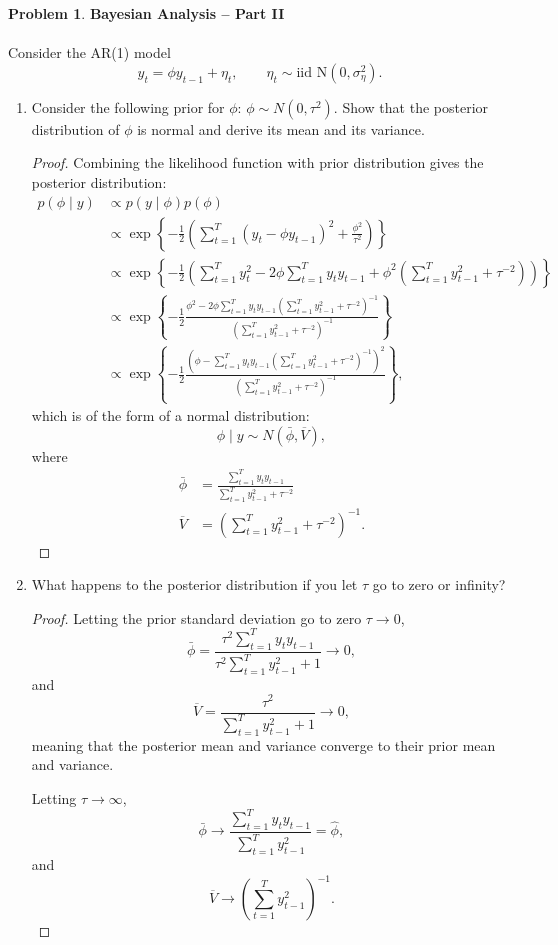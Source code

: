 \documentclass[oneside,reqno]{amsart}
\theoremstyle{definition}
\newtheorem{prob}{Problem}
\begin{document}
\begin{prob}
\textbf{Bayesian Analysis -- Part II} 
\\ \\
Consider the AR(1) model 
\[
	y_t = \phi y_{t-1} + \eta_t, \qquad \eta_t \sim \text{iid N} (0, \sigma_\eta^2).
\]
\end{prob}


\begin{enumerate}
\item
Consider the following prior for $\phi$: $\phi \sim N(0, \tau^2)$. Show that the posterior distribution of $\phi$ is normal and derive its mean and its variance.

\begin{proof}
Combining the likelihood function with prior distribution gives the posterior distribution:
\begin{align*}
	p(\phi \mid y) & \propto p(y \mid \phi) p(\phi) \\ 
	& \propto \exp\left\{- \frac{1}{2} \left( \sum_{t=1}^{T} (y_t - \phi y_{t-1} )^2  +\frac{\phi^2}{\tau^2} \right) \right\} \\
	&\propto \exp\left\{- \frac{1}{2}  \left( \sum_{t=1}^{T} y_t^2 - 2 \phi \sum_{t=1}^{T} y_t y_{t-1} + \phi^2 \left(\sum_{t=1}^{T} y_{t-1}^2 + \tau^{-2} \right) \right)\right\} \\
	& \propto \exp\left\{ - \frac{1}{2}\frac{\phi^2 - 2 \phi \sum_{t=1}^{T} y_t  y_{t-1} (\sum_{t=1}^{T}y_{t-1}^2 + \tau^{-2})^{-1}}{(\sum_{t=1}^{T} y_{t-1}^2 + \tau^{-2})^{-1}} \right\} \\
	& \propto \exp\left\{ - \frac{1}{2}\frac{(\phi - \sum_{t=1}^{T} y_t y_{t-1} (\sum_{t=1}^{T} y_{t-1}^2 + \tau^{-2})^{-1})^2}{(\sum_{t=1}^{T}  y_{t-1}^2 + \tau^{-2})^{-1}} \right\},
\end{align*}
which is of the form of a normal distribution: 
\[
	\phi \mid y\sim N(\bar \phi, \overline V),
\]
where 
\begin{align*}
	\bar \phi &=\frac{ \sum_{t=1}^{T} y_t y_{t-1}}{\sum_{t=1}^{T}y_{t-1}^2 + \tau^{-2}} \\
	\overline V &= \left(\sum_{t=1}^{T} y_{t-1}^2 + \tau^{-2} \right)^{-1}.
\end{align*}
\end{proof}


\item
What happens to the posterior distribution if you let $\tau$ go to zero or infinity?
 
\begin{proof}
Letting the prior standard deviation go to zero $\tau \to 0$, 
\[
	\bar \phi =\frac{\tau^2 \sum_{t=1}^{T} y_t y_{t-1}}{\tau^2 \sum_{t=1}^{T}y_{t-1}^2 + 1} \to 0,
\]
and 
\[
	\overline V = \frac{\tau^2}{\sum_{t=1}^{T} y_{t-1}^2 + 1} \to 0,
\]
meaning that the posterior mean and variance converge to their prior mean and variance. 
\par
Letting $\tau \to \infty$, 
\[
	\bar \phi \to \frac{\sum_{t=1}^T y_t y_{t-1}}{\sum_{t=1}^T y_{t-1}^2} 
	= \hat \phi,
\]
and 
\[
	\overline V \to  \left(\sum_{t=1}^{T} y_{t-1}^2 \right)^{-1}.
\]
\end{proof}



\end{enumerate}
\end{document}
